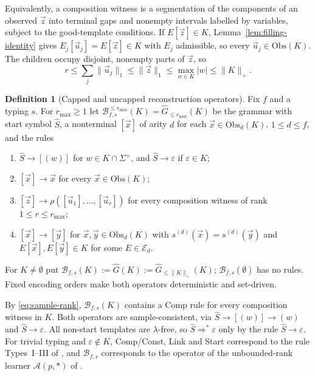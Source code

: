 \documentclass[11pt]{article}
\numberwithin{equation}{section}
\theoremstyle{plain}
\theoremstyle{definition}
\newtheorem{definition}[theorem]{Definition}
\theoremstyle{remark}
\newcommand{\tuple}[1]{\vec{#1}}
\newcommand{\eps}{\varepsilon}
\begin{document}
Equivalently, a composition witness is a segmentation of the components of an
observed $\tuple z$ into terminal gaps and nonempty intervals labelled by
variables, subject to the good-template conditions.  If $E[\tuple z]\in K$,
Lemma~\ref{lem:filling-identity} gives $E_j[\tuple u_j]=E[\tuple z]\in K$ with
$E_j$ admissible, so every $\tuple u_j\in\mathrm{Obs}(K)$.  The children occupy
disjoint, nonempty parts of $\tuple z$, so
\begin{equation}
\label{eq:sample-rank}
 r\le\textstyle\sum_j\|\tuple u_j\|_1\le\|\tuple z\|_1\le\max_{w\in K}|w|
 \le\|K\|_+ .
\end{equation}

\begin{definition}[Capped and uncapped reconstruction operators]
\label{def:reconstruction}
Fix $f$ and a typing $s$.  For $r_{\max}\ge1$ let
$\mathcal B_{f,s}^{\le r_{\max}}(K)=\widehat G_{\le r_{\max}}(K)$ be the
grammar with start symbol $\widehat S$, a nonterminal $[\tuple x]$ of arity
$d$ for each $\tuple x\in\mathrm{Obs}_d(K)$, $1\le d\le f$, and the rules
\begin{enumerate}[leftmargin=*]
\item[\textnormal{(Start)}] $\widehat S\to[(w)]$ for $w\in K\cap\Sigma^+$, and
      $\widehat S\to\eps$ if $\eps\in K$;
\item[\textnormal{(Const)}] $[\tuple x]\to\tuple x$ for every
      $\tuple x\in\mathrm{Obs}(K)$;
\item[\textnormal{(Comp)}] $[\tuple z]\to\rho([\tuple u_1],\ldots,[\tuple u_r])$
      for every composition witness of rank $1\le r\le r_{\max}$;
\item[\textnormal{(Link)}] $[\tuple x]\to[\tuple y]$ for
      $\tuple x,\tuple y\in\mathrm{Obs}_d(K)$ with
      $s^{(d)}(\tuple x)=s^{(d)}(\tuple y)$ and $E[\tuple x],E[\tuple y]\in K$
      for some $E\in\mathcal E_d$.
\end{enumerate}
For $K\ne\emptyset$ put $\mathcal B_{f,s}(K):=\widehat G(K):=
\widehat G_{\le\|K\|_+}(K)$; $\mathcal B_{f,s}(\emptyset)$ has no rules.
Fixed encoding orders make both operators deterministic and set-driven.
\end{definition}

By \eqref{eq:sample-rank}, $\mathcal B_{f,s}(K)$ contains a Comp rule for every
composition witness in $K$.  Both operators are sample-consistent, via
$\widehat S\to[(w)]\to(w)$ and $\widehat S\to\eps$.  All non-start templates
are $\lambda$-free, so $\widehat S\Rightarrow^*\eps$ only by the rule
$\widehat S\to\eps$.  For trivial typing and $\eps\notin K$, Comp/Const, Link
and Start correspond to the rule Types~I--III of
\cite[Section~4.1]{Yoshinaka2011}, and $\mathcal B_{f,s}$ corresponds to the
operator of the unbounded-rank learner
$\mathcal A(p,*)$ of \cite[Corollary~2]{Yoshinaka2011}.
\end{document}
